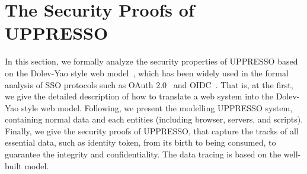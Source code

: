 \appendix

\renewcommand{\algorithmicrequire}{\textbf{Input:}}
\newcommand{\deflet}{\textbf{let}}
\newcommand{\mystate}[1]{\STATE \textbf{let} {{}#1}}
\newcommand{\mystop}[1]{\STATE \textbf{stop} \myss{\myangle{{{}#1}}, s'}}
\newcommand{\myss}[1]{${{}#1}$}
\newcommand{\myangle}[1]{\langle {{}#1} \rangle}
\newcommand{\myif}[1]{\IF{\myss{{{}#1}}}}
\newcommand{\myelse}[1]{\ELSIF{\myss{{{}#1}}}}
\newcommand{\SWITCH}[1]{\STATE \textbf{switch} #1\ \textbf{do} \begin{ALC@g}}
\newcommand{\ENDSWITCH}{\end{ALC@g}\STATE \textbf{end switch}}
\newcommand{\CASE}[1]{\STATE \textbf{case} #1\textbf{:} \begin{ALC@g}}
\newcommand{\ENDCASE}{\end{ALC@g}}
\newcommand{\CASELINE}[1]{\STATE \textbf{case} #1\textbf{:} }
\newcommand{\DEFAULT}{\STATE \textbf{default:} \begin{ALC@g}}
\newcommand{\ENDDEFAULT}{\end{ALC@g}}
\newcommand{\DEFAULTLINE}[1]{\STATE \textbf{default:} }




\section{The Security Proofs of UPPRESSO}
\label{ape:model}
In this section,
we  formally analyze  the security properties of UPPRESSO based on the Dolev-Yao style web model~\cite{SPRESSO}, which has been widely used in the formal analysis of SSO protocols such as OAuth 2.0~\cite{FettKS16} and OIDC~\cite{FettKS17}.
That is, at the first, we give the detailed description of how to translate a web system into the Dolev-Yao style web model.
Following, we present the modelling UPPRESSO system, containing normal data and each entities (including browser, servers, and scripts).
Finally, we give the security proofs of UPPRESSO, that capture the tracks of all essential data, such as identity token, from its birth to being consumed, to guarantee the integrity and confidentiality.
The data tracing is based on the well-built model.




